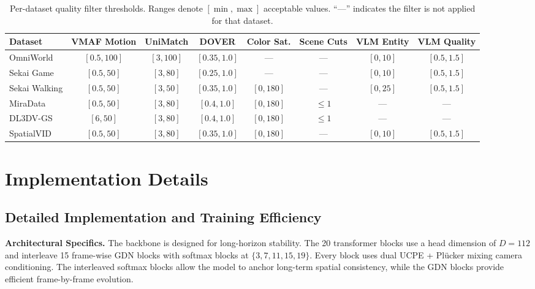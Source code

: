 \begin{table}[htbp]
\centering
\caption{Per-dataset quality filter thresholds. Ranges denote $[\min, \max]$ acceptable values. ``---'' indicates the filter is not applied for that dataset.}
\label{tab:filter_thresholds}
\scriptsize
\begin{tabular}{@{}lccccccc@{}}
\toprule
\textbf{Dataset} & \textbf{VMAF Motion} & \textbf{UniMatch} & \textbf{DOVER} & \textbf{Color Sat.} & \textbf{Scene Cuts} & \textbf{VLM Entity} & \textbf{VLM Quality} \\
\midrule
OmniWorld       & $[0.5, 100]$ & $[3, 100]$ & $[0.35, 1.0]$ & ---          & ---    & $[0, 10]$  & $[0.5, 1.5]$ \\
Sekai Game      & $[0.5, 50]$  & $[3, 80]$  & $[0.25, 1.0]$ & ---          & ---    & $[0, 10]$  & $[0.5, 1.5]$ \\
Sekai Walking   & $[0.5, 50]$  & $[3, 50]$  & $[0.35, 1.0]$ & $[0, 180]$   & ---    & $[0, 25]$  & $[0.5, 1.5]$ \\
MiraData        & $[0.5, 50]$  & $[3, 80]$  & $[0.4, 1.0]$  & $[0, 180]$   & $\leq 1$ & ---        & --- \\
DL3DV-GS        & $[6, 50]$    & $[3, 80]$  & $[0.4, 1.0]$  & $[0, 180]$   & $\leq 1$ & ---        & --- \\
SpatialVID      & $[0.5, 50]$  & $[3, 80]$  & $[0.35, 1.0]$ & $[0, 180]$   & ---    & $[0, 10]$  & $[0.5, 1.5]$ \\
\bottomrule
\end{tabular}
\end{table}
















\section{Implementation Details}
\label{sec:appendix}

\subsection{Detailed Implementation and Training Efficiency}
\label{sec:impl_details_appendix}

\noindent \textbf{Architectural Specifics.}
The \modelname backbone is designed for long-horizon stability. The 20 transformer blocks use a head dimension of $D{=}112$ and interleave 15 frame-wise GDN blocks with softmax blocks at $\{3,7,11,15,19\}$. Every block uses dual UCPE + Pl\"ucker mixing camera conditioning. The interleaved softmax blocks allow the model to anchor long-term spatial consistency, while the GDN blocks provide efficient frame-by-frame evolution.

